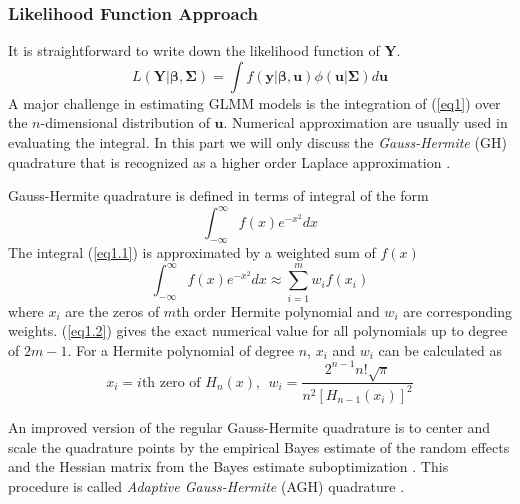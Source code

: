 	\subsubsection{Likelihood Function Approach}
	It is straightforward  to write down the likelihood function of $\bm Y$.
	\begin{equation}\label{eq1}
		L(\bm Y|\bm\beta, \bm \Sigma) = \int f(\bm y|\bm \beta, \bm u)\phi(\bm u|\bm \Sigma)d \bm u
	\end{equation}
	A major challenge in estimating GLMM models is the integration of (\ref{eq1}) over the $n$-dimensional distribution of $\bm u$. Numerical approximation are usually used in evaluating the integral. In this part we will only discuss the \textit{Gauss-Hermite} (GH) quadrature that is recognized as a higher order Laplace approximation \citep{liu1994note}.

	Gauss-Hermite quadrature is defined in terms of integral of the form 
	\begin{equation}\label{eq1.1}
		\int_{-\infty}^{\infty}f(x) e^{-x^2}dx
	\end{equation}
	The integral  (\ref{eq1.1}) is approximated by a weighted sum of  $f(x)$ 
	\begin{equation}\label{eq1.2}
		\int_{-\infty}^{\infty}f(x) e^{-x^2}dx \approx \sum_{i=1}^m w_if(x_i)
	\end{equation}
	where $x_i$ are the zeros of $m$th order Hermite polynomial and $w_i$ are corresponding weights.  (\ref{eq1.2}) gives the exact numerical value for all polynomials up to degree of $2m-1$. For a Hermite polynomial of degree $n$, $x_i$ and $w_i$ can be calculated as 	
	\begin{equation}\label{eq1.3}
		x_i = i\text{th zero of } H_n(x),~~  w_i = \frac{2^{n-1}n!\sqrt{\pi}}{n^2[H_{n-1}(x_i)]^2} 
	\end{equation}

	An improved version of the regular Gauss-Hermite quadrature is to center and scale the quadrature points  by the empirical Bayes estimate of the random effects and the Hessian matrix from the Bayes estimate suboptimization \citep{liu1994note}. This procedure is called \textit{Adaptive Gauss-Hermite} (AGH) quadrature \citep{pinheiro1995approximations}. %
	
